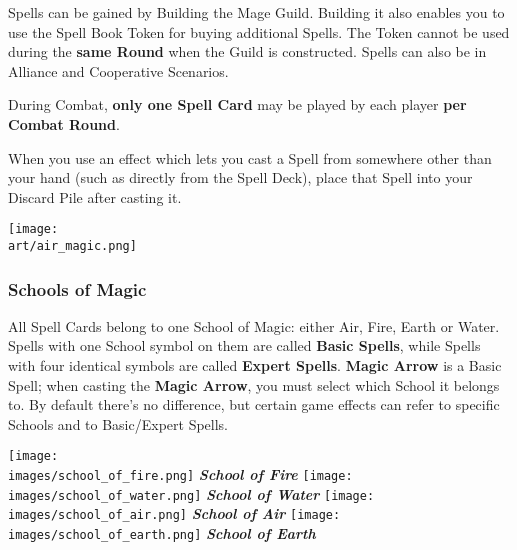 \begin{multicols*}{2}
Spells can be gained by Building the Mage Guild.
Building it also enables you to use the Spell Book Token for buying additional Spells.
The Token cannot be used during the \textbf{same Round} when the Guild is constructed. Spells can also be  in Alliance and Cooperative Scenarios.

During Combat, \textbf{only one Spell Card} may be played by each player \textbf{per Combat Round}.

\columnbreak
When you use an effect which lets you cast a Spell from somewhere other than your hand (such as directly from the Spell Deck), place that Spell into your Discard Pile after casting it.

\begin{center}
  \vspace*{\fill}
  {\texttt{[image: \\art/air\_magic.png]}}
  \vspace*{\fill}
\end{center}

\subsubsection*{Schools of Magic}
All Spell Cards belong to one School of Magic: either Air, Fire, Earth or Water.
Spells with one School symbol on them are called \textbf{Basic Spells}, while Spells with four identical symbols are called \textbf{Expert Spells}.
\textbf{Magic Arrow} is a Basic Spell; when casting the \textbf{Magic Arrow}, you must select which School it belongs to.
By default there's no difference, but certain game effects can refer to specific Schools and to Basic/Expert Spells.

\begin{minipage}[t]{0.48\textwidth}
  \centering
    \centering
    \texttt{[image: \\images/school\_of\_fire.png]}
    \textit{\textbf{\textcolor{darkcandyapplered}{School of Fire}}}
  \endminipage
    \centering
    \texttt{[image: \\images/school\_of\_water.png]}
    \textit{\textbf{\textcolor{darkcandyapplered}{School of Water}}}
  \endminipage
  \hfill\allowbreak%
  \bigbreak
    \centering
    \texttt{[image: \\images/school\_of\_air.png]}
    \textit{\textbf{\textcolor{darkcandyapplered}{School of Air}}}
  \endminipage
    \centering
    \texttt{[image: \\images/school\_of\_earth.png]}
    \textit{\textbf{\textcolor{darkcandyapplered}{School of Earth}}}
  \endminipage
  \bigbreak
\end{minipage}


\end{multicols*}
